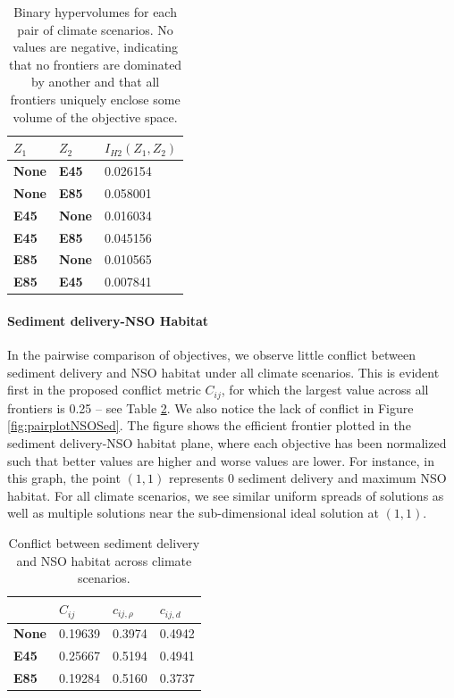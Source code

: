\begin{table}[]
\centering
\caption[Binary hypervolume values for each pair of climate scenarios]{Binary hypervolumes for each pair of climate scenarios. No values are negative, indicating that no frontiers are dominated by another and that all frontiers uniquely enclose some volume of the objective space.}
\label{tab:binaryHypervols}
\begin{tabular}{lll}
\textbf{$Z_1$} & \textbf{$Z_2$} & \textbf{$I_{H2}(Z_1,Z_2)$} \\ \hline
\textbf{None}  & \textbf{E45}   & 0.026154                   \\
\textbf{None}  & \textbf{E85}   & 0.058001                   \\
\textbf{E45}   & \textbf{None}  & 0.016034                   \\
\textbf{E45}   & \textbf{E85}   & 0.045156                   \\
\textbf{E85}   & \textbf{None}  & 0.010565                   \\
\textbf{E85}   & \textbf{E45}   & 0.007841                  
\end{tabular}
\end{table}

\paragraph{Sediment delivery-NSO Habitat}
In the pairwise comparison of objectives, we observe little conflict between sediment delivery and NSO habitat under all climate scenarios. This is evident first in the proposed conflict metric $C_{ij}$, for which the largest value across all frontiers is 0.25 -- see Table \ref{tab:pairConflict-SedNSO}. We also notice the lack of conflict in Figure \ref{fig:pairplotNSOSed}. The figure shows the efficient frontier plotted in the sediment delivery-NSO habitat plane, where each objective has been normalized such that better values are higher and worse values are lower. For instance, in this graph, the point $(1,1)$ represents 0 sediment delivery and maximum NSO habitat. For all climate scenarios, we see similar uniform spreads of solutions as well as multiple solutions near the sub-dimensional ideal solution at $(1,1)$.

\begin{table}[]
\centering
\caption[Sediment-NSO conflict across climate scenarios]{Conflict between sediment delivery and NSO habitat across climate scenarios.}
\label{tab:pairConflict-SedNSO}
\begin{tabular}{llll}
\textbf{}     & \textbf{$C_{ij}$} & \textbf{$c_{ij,\rho}$} & \textbf{$c_{ij,d}$} \\ \hline
\textbf{None} & 0.19639           & 0.3974                 & 0.4942              \\
\textbf{E45}  & 0.25667           & 0.5194                 & 0.4941              \\
\textbf{E85}  & 0.19284           & 0.5160                 & 0.3737             
\end{tabular}
\end{table}


